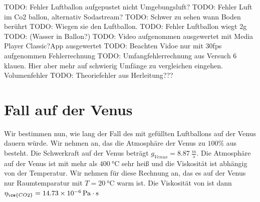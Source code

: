 \documentclass{article}
\begin{document}
        TODO: Fehler Luftballon aufgepustet nicht Umgebungsluft?
        TODO: Fehler Luft im Co2 ballon, alternativ Sodastream?
        TODO: Schwer zu sehen wann Boden berührt
        TODO: Wiegen sie den Luftballon.
        TODO: Fehler Luftballon wiegt 2g
        TODO: (Wasser in Ballon?)
        TODO: Video aufgenommen ausgewertet mit Media Player Classic?App ausgewertet
        TODO: Beachten Vidoe nur mit 30fps aufgenommen Fehlerrechnung
        TODO: Umfangfehlerrechnung aus Versuch 6 klauen. Hier aber mehr auf schwierig Umfänge zu vergleichen eingehen. Volumenfehler
        TODO: Theoriefehler aus Herleitung???

    \section{Fall auf der Venus}
        Wir bestimmen nun, wie lang der Fall des mit  gefüllten Luftballons auf der Venus dauern würde. Wir nehmen an,
        das die Atmosphäre der Venus zu \( 100\% \) aus  besteht. Die Schwerkraft auf der Venus beträgt \(g_{Venus} = \SI{8.87}{\frac{m}{s}}\).
        Die Atmosphäre auf der Venus ist mit mehr als \(\SI{400}{\celsius}\) sehr heiß und die Viskosität ist abhängig von der Temperatur.
        Wir nehmen für diese Rechnung an, das es auf der Venus nur Raumtemparatur mit \(T = \SI{20}{\celsius}\) warm ist.
        Die Viskosität von  ist dann \( \eta_{\ce{CO2}} = \SI{14.73e-6}{\pascal\cdot\second} \)
\end{document}
